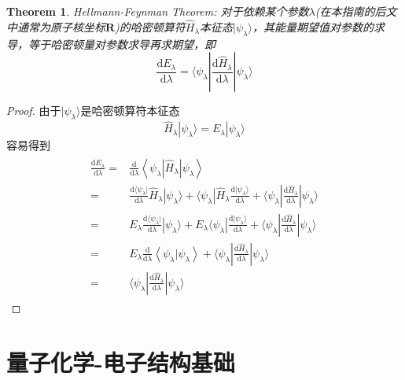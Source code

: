 \documentclass{article}
\newtheorem{theorem}{Theorem}[section]
\newtheorem{proof}{Proof}[section]
\numberwithin{equation}{section}
\begin{document}
  \begin{theorem}
    Hellmann-Feynman Theorem:
    对于依赖某个参数$\lambda$(在本指南的后文中通常为原子核坐标$\mathbf{R}$)的哈密顿算符$\hat{H}_\lambda$本征态$|\psi_\lambda\rangle$，其能量期望值对参数的求导，等于哈密顿量对参数求导再求期望，即
    \begin{equation}
      \frac{\mathrm{d}E_\lambda}{\mathrm{d}\lambda} = \langle\psi_\lambda|\frac{\mathrm{d}\hat{H}_\lambda}{\mathrm{d}\lambda}|\psi_\lambda\rangle
    \end{equation}
  \end{theorem}

  \begin{proof}
    由于$|\psi_\lambda\rangle$是哈密顿算符本征态
    \begin{equation*}
      \hat{H}_\lambda|\psi_\lambda\rangle=E_\lambda|\psi_\lambda\rangle
    \end{equation*}  
    容易得到
    \begin{align*}
      \begin{aligned}
        \frac{\mathrm{d} E_{\lambda}}{\mathrm{d} \lambda}=&\frac{\mathrm{d}}{\mathrm{d} \lambda}\left\langle\psi_{\lambda}\left|\hat{H}_{\lambda}\right| \psi_{\lambda}\right\rangle\\
        =&\frac{\mathrm{d} \langle\psi_\lambda|}{\mathrm{d} \lambda}\hat{H}_\lambda|\psi_\lambda\rangle+\langle\psi_\lambda|\hat{H}_\lambda\frac{\mathrm{d} |\psi_\lambda\rangle}{\mathrm{d} \lambda}+\langle\psi_\lambda|\frac{\mathrm{d}\hat{H}_\lambda}{\mathrm{d}\lambda}|\psi_\lambda\rangle\\
        =&E_\lambda\frac{\mathrm{d} \langle\psi_\lambda|}{\mathrm{d} \lambda}|\psi_\lambda\rangle+E_\lambda\langle\psi_\lambda|\frac{\mathrm{d} |\psi_\lambda\rangle}{\mathrm{d} \lambda}+\langle\psi_\lambda|\frac{\mathrm{d}\hat{H}_\lambda}{\mathrm{d}\lambda}|\psi_\lambda\rangle\\
        =&E_\lambda\frac{\mathrm{d}}{\mathrm{d}\lambda}\left\langle\psi_{\lambda} | \psi_{\lambda}\right\rangle+\langle\psi_\lambda|\frac{\mathrm{d}\hat{H}_\lambda}{\mathrm{d}\lambda}|\psi_\lambda\rangle\\
        =&\langle\psi_\lambda|\frac{\mathrm{d}\hat{H}_\lambda}{\mathrm{d}\lambda}|\psi_\lambda\rangle
      \end{aligned}
    \end{align*}
  \end{proof}
    \section{量子化学-电子结构基础}
\end{document}
